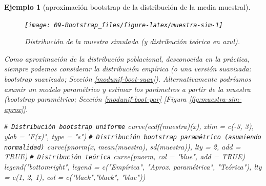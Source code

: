 \documentclass[
  10pt,
]{book}
\newenvironment{Shaded}{\begin{snugshade}}{\end{snugshade}}
\newcommand{\AttributeTok}[1]{\textcolor[rgb]{0.77,0.63,0.00}{#1}}
\newcommand{\CommentTok}[1]{\textcolor[rgb]{0.56,0.35,0.01}{\textit{#1}}}
\newcommand{\ConstantTok}[1]{\textcolor[rgb]{0.00,0.00,0.00}{#1}}
\newcommand{\DecValTok}[1]{\textcolor[rgb]{0.00,0.00,0.81}{#1}}
\newcommand{\FunctionTok}[1]{\textcolor[rgb]{0.00,0.00,0.00}{#1}}
\newcommand{\NormalTok}[1]{#1}
\newcommand{\SpecialCharTok}[1]{\textcolor[rgb]{0.00,0.00,0.00}{#1}}
\newcommand{\StringTok}[1]{\textcolor[rgb]{0.31,0.60,0.02}{#1}}
\theoremstyle{break}
\newtheorem{example}{Ejemplo}[chapter]
\theoremstyle{nonumberplain}
\renewcommand{\CommentTok}[1]{\textcolor[rgb]{0.41,0.41,0.41}{\texttt{#1}}}
\begin{document}
\begin{example}[aproximación bootstrap de la distribución de la media muestral]
\begin{figure}[!htbp]

{\centering \texttt{[image: 09-Bootstrap\_files/figure-latex/muestra-sim-1]} 

}

\caption{Distribución de la muestra simulada (y distribución teórica en azul).}\label{fig:muestra-sim}
\end{figure}

Como aproximación de la distribución poblacional, desconocida en la práctica, siempre podemos considerar la distribución empírica (o una versión suavizada: bootstrap suavizado; Sección \ref{modunif-boot-suav}).
Alternativamente podríamos asumir un modelo paramétrico y estimar los parámetros a partir de la muestra (bootstrap paramétrico; Sección \ref{modunif-boot-par} {[}Figura \ref{fig:muestra-sim-aprox}{]}.

\begin{Shaded}
\begin{Highlighting}[]
\CommentTok{\# Distribución bootstrap uniforme}
\FunctionTok{curve}\NormalTok{(}\FunctionTok{ecdf}\NormalTok{(muestra)(x), }\AttributeTok{xlim =} \FunctionTok{c}\NormalTok{(}\SpecialCharTok{{-}}\DecValTok{3}\NormalTok{, }\DecValTok{3}\NormalTok{), }\AttributeTok{ylab =} \StringTok{"F(x)"}\NormalTok{, }\AttributeTok{type =} \StringTok{"s"}\NormalTok{)}
\CommentTok{\# Distribución bootstrap paramétrico (asumiendo normalidad)}
\FunctionTok{curve}\NormalTok{(}\FunctionTok{pnorm}\NormalTok{(x, }\FunctionTok{mean}\NormalTok{(muestra), }\FunctionTok{sd}\NormalTok{(muestra)), }\AttributeTok{lty =} \DecValTok{2}\NormalTok{, }\AttributeTok{add =} \ConstantTok{TRUE}\NormalTok{)}
\CommentTok{\# Distribución teórica}
\FunctionTok{curve}\NormalTok{(pnorm, }\AttributeTok{col =} \StringTok{"blue"}\NormalTok{, }\AttributeTok{add =} \ConstantTok{TRUE}\NormalTok{)}
\FunctionTok{legend}\NormalTok{(}\StringTok{"bottomright"}\NormalTok{, }\AttributeTok{legend =} \FunctionTok{c}\NormalTok{(}\StringTok{"Empírica"}\NormalTok{, }\StringTok{"Aprox. paramétrica"}\NormalTok{, }\StringTok{"Teórica"}\NormalTok{),}
       \AttributeTok{lty =} \FunctionTok{c}\NormalTok{(}\DecValTok{1}\NormalTok{, }\DecValTok{2}\NormalTok{, }\DecValTok{1}\NormalTok{), }\AttributeTok{col =} \FunctionTok{c}\NormalTok{(}\StringTok{"black"}\NormalTok{,}\StringTok{"black"}\NormalTok{, }\StringTok{"blue"}\NormalTok{))}
\end{Highlighting}
\end{Shaded}

\begin{figure}[!htbp]


\end{figure}
\end{example}
\end{document}

